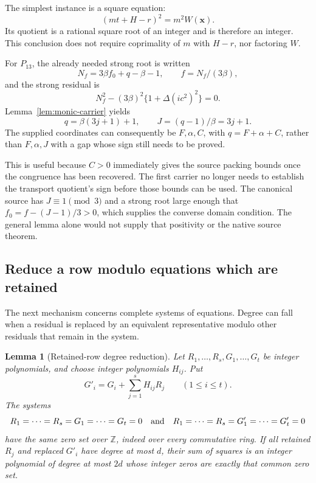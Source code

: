 \documentclass[11pt,a4paper]{article}
\newtheorem{lemma}[theorem]{Lemma}
\theoremstyle{definition}
\newcommand{\Z}{\mathbb Z}
\begin{document}
The simplest instance is a square equation:
\begin{equation}
 (mt+H-r)^2=m^2W(\mathbf x).
 \label{eq:monic-square-carrier}
\end{equation}
Its quotient is a rational square root of an integer and is therefore an
integer.  This conclusion does not require coprimality of \(m\) with
\(H-r\), nor factoring \(W\).

For \(P_{13}\), the already needed strong root is written
\[
 N_f=3\beta f_0+q-\beta-1,\qquad f=N_f/(3\beta),
\]
and the strong residual is
\[
 N_f^2-(3\beta)^2\{1+\Delta(ic^2)^2\}=0.
\]
Lemma~\ref{lem:monic-carrier} yields
\[
 q=\beta(3j+1)+1,\qquad J=(q-1)/\beta=3j+1.
\]
The supplied coordinates can consequently be \(F,\alpha,C\), with
\(q=F+\alpha+C\), rather than \(F,\alpha,J\) with a gap whose sign still
needs to be proved.

This is useful because \(C>0\) immediately gives the source packing bounds
once the congruence has been recovered.  The first carrier no longer
needs to establish the transport quotient's sign before those bounds
can be used.  The canonical source has \(J\equiv1\pmod3\) and a strong
root large enough that \(f_0=f-(J-1)/3>0\), which supplies the converse
domain condition.  The general lemma alone would not supply that
positivity or the native source theorem.

\subsection{Reduce a row modulo equations which are retained}

The next mechanism concerns complete systems of equations.  Degree can
fall when a residual is replaced by an equivalent representative modulo
other residuals that remain in the system.

\begin{lemma}[Retained-row degree reduction]
\label{lem:retained-row}
Let \(R_1,\ldots,R_s,G_1,\ldots,G_t\) be integer polynomials, and choose
integer polynomials \(H_{ij}\).  Put
\[
 G'_i=G_i+\sum_{j=1}^{s}H_{ij}R_j
 \qquad(1\le i\le t).
\]
The systems
\[
 R_1=\cdots=R_s=G_1=\cdots=G_t=0
 \quad\hbox{and}\quad
 R_1=\cdots=R_s=G'_1=\cdots=G'_t=0
\]
have the same zero set over \(\Z\), indeed over every commutative ring.
If all retained \(R_j\) and replaced \(G'_i\) have degree at most \(d\),
their sum of squares is an integer polynomial of degree at most \(2d\)
whose integer zeros are exactly that common zero set.
\end{lemma}
\end{document}
